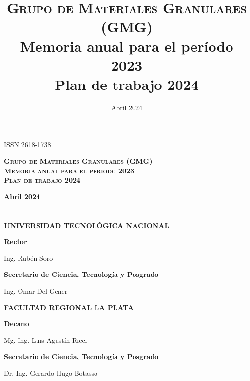 \documentclass[a4paper,11pt,twoside,final,titlepage,onecolumn,openright]{report}
\begin{document}
\title{\textsc{Grupo de Materiales Granulares (GMG)}\\
Memoria anual para el período 2023 \\
Plan de trabajo 2024}
\date{Abril 2024}


\chapter*{}

\begin{flushright}
 ISSN 2618-1738
\end{flushright}

\vspace{5cm}
\begin{center}

\textbf{\LARGE \textsc{Grupo de Materiales Granulares (GMG)} \\[1em] \textsc{Memoria anual para el período 2023} \\[1em] \textsc{Plan de trabajo 2024}}

\vspace{1cm}
\textbf{\Large Abril 2024}
\end{center}


\chapter*{}

\begin{center}

\textbf{\LARGE UNIVERSIDAD TECNOLÓGICA NACIONAL} 

\vspace{1cm}
\textbf{\Large Rector}

Ing. Rubén Soro

\vspace{0.5cm}
\textbf{\Large Secretario de Ciencia, Tecnología y Posgrado} 

Ing. Omar Del Gener

\vspace{5cm}

\textbf{\LARGE FACULTAD REGIONAL LA PLATA} 

\vspace{1cm}
\textbf{\Large Decano} 

Mg. Ing. Luis Agustín Ricci

\vspace{0.5cm}
\textbf{\Large Secretario de Ciencia, Tecnología y Posgrado}

Dr. Ing. Gerardo Hugo Botasso
 
\end{center}
\end{document}
